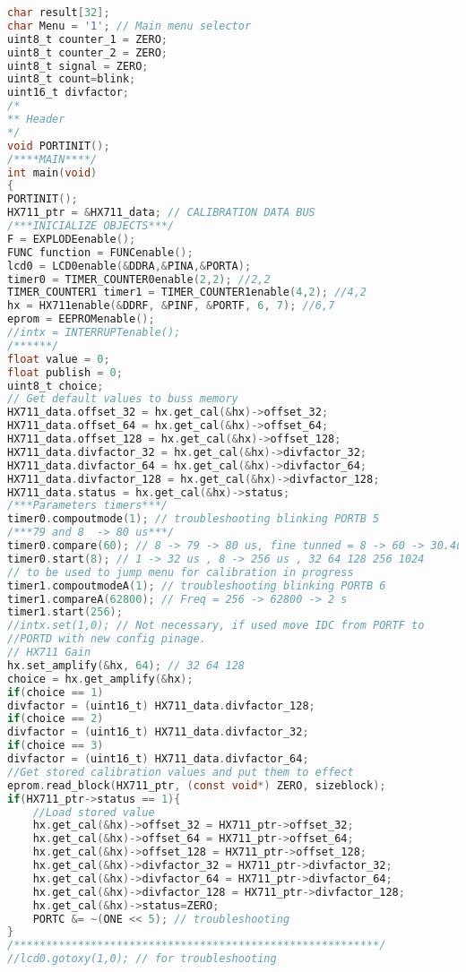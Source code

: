 \begin{lstlisting}[language=C]
char result[32];
char Menu = '1'; // Main menu selector
uint8_t counter_1 = ZERO;
uint8_t counter_2 = ZERO;
uint8_t signal = ZERO;
uint8_t count=blink;
uint16_t divfactor;
/*
** Header
*/
void PORTINIT();
/****MAIN****/
int main(void)
{
PORTINIT();
HX711_ptr = &HX711_data; // CALIBRATION DATA BUS
/***INICIALIZE OBJECTS***/
F = EXPLODEenable();
FUNC function = FUNCenable();
lcd0 = LCD0enable(&DDRA,&PINA,&PORTA);
timer0 = TIMER_COUNTER0enable(2,2); //2,2
TIMER_COUNTER1 timer1 = TIMER_COUNTER1enable(4,2); //4,2
hx = HX711enable(&DDRF, &PINF, &PORTF, 6, 7); //6,7
eprom = EEPROMenable();
//intx = INTERRUPTenable();
/******/
float value = 0;
float publish = 0;
uint8_t choice;
// Get default values to buss memory
HX711_data.offset_32 = hx.get_cal(&hx)->offset_32;
HX711_data.offset_64 = hx.get_cal(&hx)->offset_64;
HX711_data.offset_128 = hx.get_cal(&hx)->offset_128;
HX711_data.divfactor_32 = hx.get_cal(&hx)->divfactor_32;
HX711_data.divfactor_64 = hx.get_cal(&hx)->divfactor_64;
HX711_data.divfactor_128 = hx.get_cal(&hx)->divfactor_128;
HX711_data.status = hx.get_cal(&hx)->status;
/***Parameters timers***/
timer0.compoutmode(1); // troubleshooting blinking PORTB 5
/***79 and 8  -> 80 us***/
timer0.compare(60); // 8 -> 79 -> 80 us, fine tunned = 8 -> 60 -> 30.4us
timer0.start(8); // 1 -> 32 us , 8 -> 256 us , 32 64 128 256 1024
// to be used to jump menu for calibration in progress
timer1.compoutmodeA(1); // troubleshooting blinking PORTB 6
timer1.compareA(62800); // Freq = 256 -> 62800 -> 2 s
timer1.start(256);
//intx.set(1,0); // Not necessary, if used move IDC from PORTF to
//PORTD with new config pinage.
// HX711 Gain
hx.set_amplify(&hx, 64); // 32 64 128
choice = hx.get_amplify(&hx);
if(choice == 1)
divfactor = (uint16_t) HX711_data.divfactor_128;
if(choice == 2)
divfactor = (uint16_t) HX711_data.divfactor_32;
if(choice == 3)
divfactor = (uint16_t) HX711_data.divfactor_64;
//Get stored calibration values and put them to effect
eprom.read_block(HX711_ptr, (const void*) ZERO, sizeblock);
if(HX711_ptr->status == 1){
    //Load stored value 
    hx.get_cal(&hx)->offset_32 = HX711_ptr->offset_32;
    hx.get_cal(&hx)->offset_64 = HX711_ptr->offset_64;
    hx.get_cal(&hx)->offset_128 = HX711_ptr->offset_128;
    hx.get_cal(&hx)->divfactor_32 = HX711_ptr->divfactor_32;
    hx.get_cal(&hx)->divfactor_64 = HX711_ptr->divfactor_64;
    hx.get_cal(&hx)->divfactor_128 = HX711_ptr->divfactor_128;
    hx.get_cal(&hx)->status=ZERO;
    PORTC &= ~(ONE << 5); // troubleshooting
}
/*********************************************************/
//lcd0.gotoxy(1,0); // for troubleshooting

\end{lstlisting}
